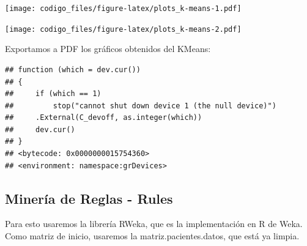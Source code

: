 \documentclass[]{article}
\newenvironment{Shaded}{\begin{snugshade}}{\end{snugshade}}
\newcommand{\KeywordTok}[1]{\textcolor[rgb]{0.13,0.29,0.53}{\textbf{#1}}}
\newcommand{\DataTypeTok}[1]{\textcolor[rgb]{0.13,0.29,0.53}{#1}}
\newcommand{\DecValTok}[1]{\textcolor[rgb]{0.00,0.00,0.81}{#1}}
\newcommand{\StringTok}[1]{\textcolor[rgb]{0.31,0.60,0.02}{#1}}
\newcommand{\CommentTok}[1]{\textcolor[rgb]{0.56,0.35,0.01}{\textit{#1}}}
\newcommand{\OtherTok}[1]{\textcolor[rgb]{0.56,0.35,0.01}{#1}}
\newcommand{\OperatorTok}[1]{\textcolor[rgb]{0.81,0.36,0.00}{\textbf{#1}}}
\newcommand{\NormalTok}[1]{#1}
\begin{document}
\texttt{[image: codigo\_files/figure-latex/plots\_k-means-1.pdf]}

\begin{Shaded}
\end{Shaded}

\texttt{[image: codigo\_files/figure-latex/plots\_k-means-2.pdf]}

Exportamos a PDF los gráficos obtenidos del KMeans:

\begin{Shaded}
\end{Shaded}

\begin{verbatim}
## function (which = dev.cur()) 
## {
##     if (which == 1) 
##         stop("cannot shut down device 1 (the null device)")
##     .External(C_devoff, as.integer(which))
##     dev.cur()
## }
## <bytecode: 0x0000000015754360>
## <environment: namespace:grDevices>
\end{verbatim}

\subsection{Minería de Reglas - Rules}\label{mineria-de-reglas---rules}

Para esto usaremos la librería RWeka, que es la implementación en R de
Weka. Como matriz de inicio, usaremos la matriz.pacientes.datos, que
está ya limpia.
\end{document}
